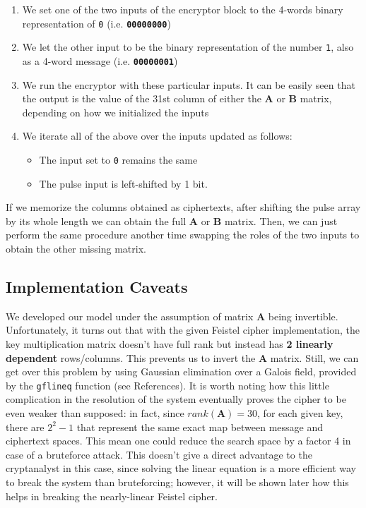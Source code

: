 \documentclass[a4paper,12pt,titlepage]{article}
\begin{document}
\begin{enumerate}
	\item We set one of the two inputs of the encryptor block to the 4-words binary
        representation of \texttt{0} (i.e. \textbf{\texttt{00000000}})
	\item We let the other input to be the binary representation of the number \texttt{1},
        also as a 4-word message (i.e. \textbf{\texttt{00000001}})
	\item We run the encryptor with these particular inputs. It can be easily seen
        that the output is the value of the 31st column of either the
        $\mathbf{A}$ or $\mathbf{B}$ matrix, depending on how we
        initialized the inputs
	\item We iterate all of the above over the inputs updated as follows:
    \begin{itemize}
      \item The input set to \texttt{0} remains the same
      \item  The pulse input is left-shifted by 1 bit.
    \end{itemize}
\end{enumerate}

If we memorize the columns obtained as ciphertexts, after shifting the pulse
array by its whole length we can obtain the full $\mathbf{A}$ or
$\mathbf{B}$ matrix. Then, we can just perform the same procedure
another time swapping the roles of the two inputs to obtain the other missing
matrix.

\subsection*{Implementation Caveats}
We developed our model under the assumption of matrix $\mathbf{A}$
being invertible. Unfortunately, it turns out that with the given Feistel cipher
implementation, the key multiplication matrix doesn't have full rank but
instead has \textbf{2 linearly dependent} rows/columns. This prevents us to invert
the $\mathbf{A}$ matrix. Still, we can get over this problem by using Gaussian
elimination over a Galois field, provided by the \texttt{gflineq} function (see
References).
It is worth noting how this little complication in the resolution of the
system eventually proves the cipher to be even weaker than supposed: in fact,
since $rank(\mathbf{A}) = 30$, for each given key, there are $2^2-1$ that
represent the same exact map between message and ciphertext spaces. This mean
one could reduce the search space by a factor 4 in case of a bruteforce attack.
This doesn't give a direct advantage to the cryptanalyst
in this case, since solving the linear equation is a more efficient way to
break the system than bruteforcing; however, it will be shown later how this helps in breaking
the nearly-linear Feistel cipher.
\end{document}
